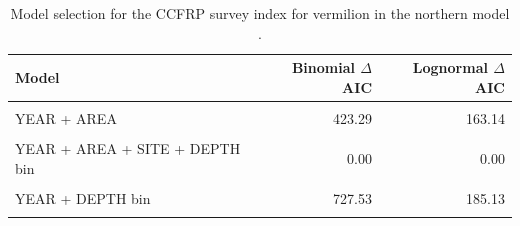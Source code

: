 \documentclass[11pt,
  english,
  a4paper,
]{article}
\begin{document}
\FloatBarrier

\begin{table}

\caption{\label{tab:tab-model-select-ccfrp}Model selection for the CCFRP survey index for vermilion in the northern model .}
\centering
\begin{tabular}[t]{lrr}
\toprule
Model & Binomial $\Delta$AIC & Lognormal $\Delta$AIC\\
\midrule
\cellcolor{gray!6}{1} & \cellcolor{gray!6}{1071.49} & \cellcolor{gray!6}{485.95}\\
YEAR + AREA & 423.29 & 163.14\\
\cellcolor{gray!6}{YEAR + AREA + SITE} & \cellcolor{gray!6}{79.34} & \cellcolor{gray!6}{40.23}\\
YEAR + AREA + SITE + DEPTH bin & 0.00 & 0.00\\
\cellcolor{gray!6}{YEAR + SITE + DEPTH bin} & \cellcolor{gray!6}{470.88} & \cellcolor{gray!6}{88.31}\\
\addlinespace
YEAR + DEPTH bin & 727.53 & 185.13\\
\cellcolor{gray!6}{YEAR + AREA + DEPTH bin} & \cellcolor{gray!6}{292.96} & \cellcolor{gray!6}{113.84}\\
\bottomrule
\end{tabular}
\end{table}

\FloatBarrier
\end{document}
